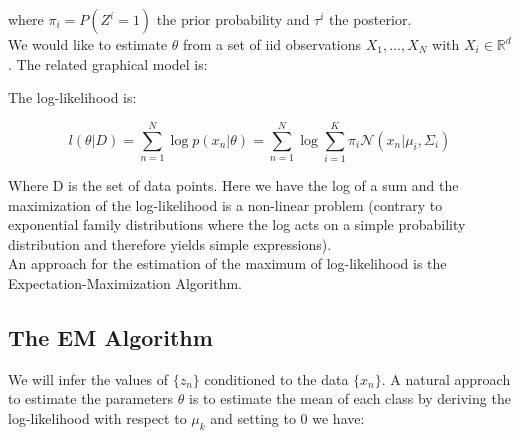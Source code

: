 \documentclass[12pt]{article}
\let\bb\mathbb       %
\def\RR{{\bb R}}\def\ZZ{{\bb Z}}\def\FF{{\bb F}}\def\DD{{\bb D}}
\def\bb{\mathbb}
\begin{document}
where $\pi_i=P(Z^i=1)$ the prior probability and $\tau^i$ the posterior.\\

We would like to estimate $\theta$ from a set of iid observations $X_1,\dots,X_N$ with $X_i\in \RR^d$. The related graphical model is:

\begin{figure}[h]
\centering
{}
\end{figure}

The log-likelihood is:

\begin{equation}
l(\theta|D)=\sum_{n=1}^{N}\log{p(x_n|\theta)}=\sum_{n=1}^{N}\log{\sum_{i=1}^K\pi_i\mathcal N(x_n|\mu_i,\Sigma_i)}
\end{equation}

Where D is the set of data points. Here we have the log of a sum and the maximization of the log-likelihood is a non-linear problem (contrary to exponential family distributions where the log acts on a simple probability distribution and therefore yields simple expressions).\\
An approach for the estimation of the maximum of log-likelihood is the Expectation-Maximization Algorithm.


\subsection{The EM Algorithm}

We will infer the values of $\{z_n\}$ conditioned to the data $\{x_n\}$. A natural approach to estimate the parameters $\theta$ is to estimate the mean of each class by deriving the log-likelihood with respect to $\mu_k$ and setting to 0 we have:
\end{document}
